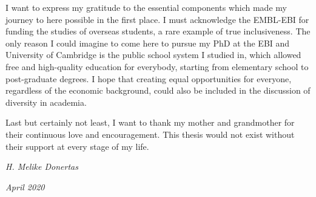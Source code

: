 \documentclass[12pt,twoside]{unicam}
\begin{document}
\begin{acknowledgements}
    \vspace{0.3cm}

    I want to express my gratitude to the essential components which made my journey to here possible in the first place. I must acknowledge the EMBL-EBI for funding the studies of overseas students, a rare example of true inclusiveness. The only reason I could imagine to come here to pursue my PhD at the EBI and University of Cambridge is the public school system I studied in, which allowed free and high-quality education for everybody, starting from elementary school to post-graduate degrees. I hope that creating equal opportunities for everyone, regardless of the economic background, could also be included in the discussion of diversity in academia.

    \vspace{0.3cm}

    Last but certainly not least, I want to thank my mother and grandmother for their continuous love and encouragement. This thesis would not exist without their support at every stage of my life.

    \vspace{0.6cm}
    \begin{flushright}
    \emph{H. Melike Donertas}

    \emph{April 2020}
    \end{flushright}
  \end{acknowledgements}
\end{document}
